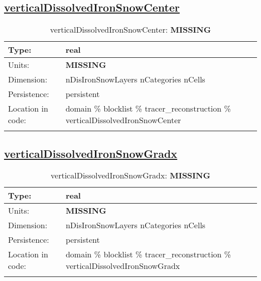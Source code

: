 \subsection[verticalDissolvedIronSnowCenter]{\hyperref[sec:var_tab_tracer_reconstruction]{verticalDissolvedIronSnowCenter}}
\label{subsec:var_sec_tracer_reconstruction_verticalDissolvedIronSnowCenter}
\begin{center}
\begin{longtable}{| p{2.0in} | p{4.0in} |}
        \hline 
        Type: & real \\
        \hline 
        Units: & {\bf \color{red} MISSING} \\
        \hline 
        Dimension: & nDisIronSnowLayers nCategories nCells \\
        \hline 
        Persistence: & persistent \\
        \hline 
         Location in code: & domain \% blocklist \% tracer\_reconstruction \% verticalDissolvedIronSnowCenter \\
         \hline 
    \caption{verticalDissolvedIronSnowCenter: {\bf \color{red} MISSING}}
\end{longtable}
\end{center}
\subsection[verticalDissolvedIronSnowGradx]{\hyperref[sec:var_tab_tracer_reconstruction]{verticalDissolvedIronSnowGradx}}
\label{subsec:var_sec_tracer_reconstruction_verticalDissolvedIronSnowGradx}
\begin{center}
\begin{longtable}{| p{2.0in} | p{4.0in} |}
        \hline 
        Type: & real \\
        \hline 
        Units: & {\bf \color{red} MISSING} \\
        \hline 
        Dimension: & nDisIronSnowLayers nCategories nCells \\
        \hline 
        Persistence: & persistent \\
        \hline 
         Location in code: & domain \% blocklist \% tracer\_reconstruction \% verticalDissolvedIronSnowGradx \\
         \hline 
    \caption{verticalDissolvedIronSnowGradx: {\bf \color{red} MISSING}}
\end{longtable}
\end{center}
